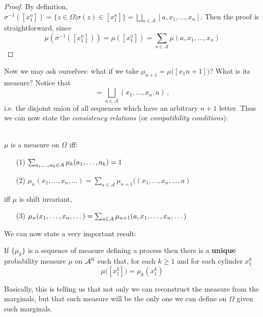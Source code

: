 \begin{proof}
    By definition, $\sigma^{-1}( [x_1^n] ) = \{ z \in \Omega \big| \sigma(z) \in [x_1^n] \} = \bigsqcup_{a \in \mathcal{A}} [a, x_1, \dots, x_n]$.
    Then the proof is straightforward, since
    \begin{equation*}
        \mu(\sigma^{-1}( [x_1^n])) = \mu( [x_1^n]) = \sum_{a \in \mathcal{A}} \mu(a, x_1, \dots, x_n)
    \end{equation*}
\end{proof}
Now we may ask ourselves: what if we take $\mu_{n+1} = \mu\big( [x_1{n+1}] \big)$? What is its measure? Notice that 
\begin{equation*}
    [x_1^n] = \bigsqcup_{a \in \mathcal{A}} (x_1, \dots, x_n, a) \, ,
\end{equation*}
i.e. the disjoint union of all sequences which have an arbitrary $n+1$ letter. Thus we can now state the \textit{consistency relations} (or \textit{compatibility conditions}):
\begin{prop}
\label{prop:consistency_rel}
\hfill
\\$\mu$ is a measure on $\Omega$ iff:
    \begin{itemize}
        \item[(1)] $\sum_{a_1, \dots, a_k \in \mathcal{A}} \mu_k(a_1, \dots, a_k) = 1$
        \item[(2)] $\mu_n(x_1, \dots, x_n, \dots) = \sum_{a \in \mathcal{A}} \mu_{n+1} ((x_1, \dots, x_n, \dots, a)$
    \end{itemize}
iff $\mu$ is shift invariant, 
    \begin{itemize}
        \item[(3)] 
         $\mu_n(x_1, \dots, x_n, \dots) = \sum_{a \in \mathcal{A}} \mu_{n+1}(a, x_1, \dots, x_n, \dots)$
    \end{itemize}
\end{prop}
We can now state a very important result:
\begin{theorem}
    If $\{ \mu_k \}$ is a sequence of measure defining a process then there is a \textbf{unique} probability measure $\mu$ on $\mathcal{A}^{\mathbb{N}}$ such that, for each $k \geq 1$ and for each cylinder $x_1^k$
    \begin{equation*}
        \mu\big( [x_1^k] \big) = \mu_k(x_1^k)
    \end{equation*}
\end{theorem}
Basically, this is telling us that not only we can reconstruct the measure from the marginals, but that such measure will be the only one we can define on $\Omega$ given such marginals.

